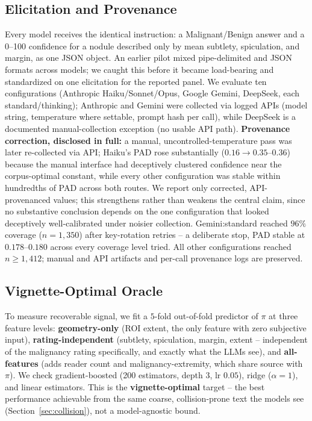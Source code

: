 \documentclass[letterpaper]{article} %
\begin{document}
\subsection{Elicitation and Provenance}
\label{sec:elicitation}
Every model receives the identical instruction: a Malignant/Benign answer
and a 0--100 confidence for a nodule described only by mean subtlety,
spiculation, and margin, as one JSON object. An earlier pilot mixed
pipe-delimited and JSON formats across models; we caught this before it
became load-bearing and standardized on one elicitation for the reported
panel. We evaluate ten configurations (Anthropic Haiku/Sonnet/Opus, Google
Gemini, DeepSeek, each standard/thinking); Anthropic and Gemini were
collected via logged APIs (model string, temperature where settable, prompt
hash per call), while DeepSeek is a documented manual-collection exception
(no usable API path). \textbf{Provenance correction, disclosed in full:} a
manual, uncontrolled-temperature pass was later re-collected via API;
Haiku's PAD rose substantially ($0.16{\to}0.35$--$0.36$) because the manual
interface had deceptively clustered confidence near the corpus-optimal
constant, while every other configuration was stable within hundredths of
PAD across both routes. We report only corrected, API-provenanced values;
this strengthens rather than weakens the central claim, since no substantive
conclusion depends on the one configuration that looked deceptively
well-calibrated under noisier collection. Gemini:standard reached $96\%$
coverage ($n{=}1{,}350$) after key-rotation retries -- a deliberate stop,
PAD stable at $0.178$--$0.180$ across every coverage level tried. All other
configurations reached $n\geq1{,}412$; manual and API artifacts and
per-call provenance logs are preserved.

\subsection{Vignette-Optimal Oracle}
\label{sec:oracle}
To measure recoverable signal, we fit a $5$-fold out-of-fold predictor of
$\pi$ at three feature levels: \textbf{geometry-only} (ROI extent, the only
feature with zero subjective input), \textbf{rating-independent} (subtlety,
spiculation, margin, extent -- independent of the malignancy rating
specifically, and exactly what the LLMs see), and \textbf{all-features}
(adds reader count and malignancy-extremity, which share source with $\pi$).
We check gradient-boosted (200 estimators, depth 3, lr $0.05$), ridge
($\alpha{=}1$), and linear estimators. This is the \textbf{vignette-optimal}
target -- the best performance achievable from the same coarse,
collision-prone text the models see (Section~\ref{sec:collision}), not a
model-agnostic bound.
\end{document}
